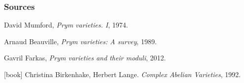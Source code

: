 \begin{frame}
\frametitle{Sources}

\begin{thebibliography}{9}

  David Mumford,
  \newblock \textit{Prym varieties. {I}}, 1974.

  Arnaud Beauville,
  \newblock \textit{Prym varieties: A survey}, 1989.

  Gavril Farkas,
  \newblock \textit{Prym varieties and their moduli}, 2012.

  [book]
  Christina Birkenhake, Herbert Lange.
  \newblock \textit{Complex Abelian Varieties}, 1992.

\end{thebibliography}
\end{frame}